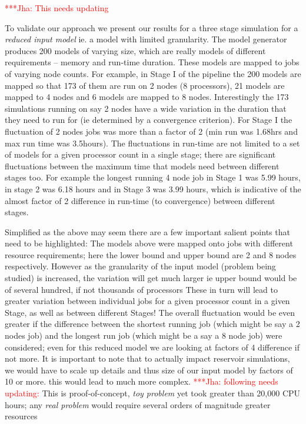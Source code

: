 \documentclass[conference,final]{IEEEtran}
\newcommand{\jha}[0]{}
\newcommand{\jhanote}[1]{ {\textcolor{red} { ***Jha: #1 }}}
\begin{document}
\jhanote{This needs updating}

To validate our approach we present our results for a three stage
simulation for a {\it reduced input model} ie. a model with limited
granularity. The model generator produces 200 models of varying size,
which are really models of different requirements -- memory and
run-time duration. These models are mapped to jobs of varying node
counts.  For example, in Stage I of the pipeline the 200 models are
mapped so that 173 of them are run on 2 nodes (8 processors), 21
models are mapped to 4 nodes and 6 models are mapped to 8 nodes.
Interestingly the 173 simulations running on say 2 nodes have a wide
variation in the duration that they need to run for (ie determined by
a convergence criterion). For Stage I the fluctuation of 2 nodes jobs
was more than a factor of 2 (min run was 1.68hrs and max run time was
3.5hours). The fluctuations in run-time are not limited to a set of
models for a given processor count in a single stage; there are
significant fluctuations between the maximum time that models need
between different stages too.  For example the longest running 4 node
job in Stage 1 was 5.99 hours, in stage 2 was 6.18 hours and in Stage
3 was 3.99 hours, which is indicative of the almost factor of 2
difference in run-time (to convergence) between different stages.


Simplified as the above may seem there are a few important salient
points that need to be highlighted: The models above were mapped onto
jobs with different resource requirements; here the lower bound and
upper bound are 2 and 8 nodes respectively. However as the granularity
of the input model (problem being studied) is increased, the variation
will get much larger ie upper bound would be of several hundred, if
not thousands of processors 
These in turn will lead to greater variation between individual jobs
for a given processor count in a given Stage, as well as between
different Stages!  The overall fluctuation would be even greater if
the difference between the shortest running job (which might be say a
2 nodes job) and the longest run job (which might be a say a 8 node
job) were considered; even for this reduced model we are looking at
factors of 4 difference if not more.  It is important to note that to
actually impact reservoir simulations, we would have to scale up
details and thus size of our input model by factors of 10 or more.
this would lead to much more complex.%
\jhanote{following needs updating:} This is proof-of-concept, {\it toy
  problem} yet took greater than 20,000 CPU hours; any {\it real
  problem} would require several orders of magnitude greater resources
\end{document}
